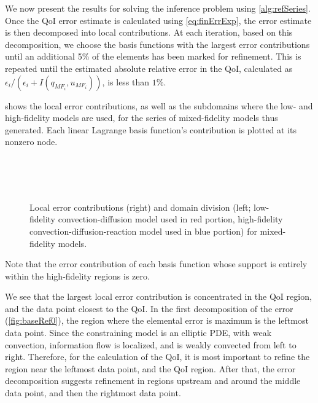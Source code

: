 We now present the results for solving the inference problem using \cref{alg:refSeries}. Once the QoI error estimate is calculated using \cref{eq:finErrExp}, the error estimate is then decomposed into local contributions. At each iteration, based on this decomposition, we choose the basis functions with the largest error contributions until an additional 5\% of the elements has been marked for refinement. This is repeated until the estimated absolute relative error in the QoI, calculated as $\epsilon_i/(\epsilon_i+I(q_{MF_i},u_{MF_i}))$, is less than $1\%$.

 shows the local error contributions, as well as the subdomains where the low- and high-fidelity models are used, for the series of mixed-fidelity models thus generated. Each linear Lagrange basis function's contribution is plotted at its nonzero node.
%
\begin{figure}[htbp]
\centering
{} \\
 \\
 \\
\caption{Local error contributions (right) and domain division (left; low-fidelity convection-diffusion model used in red portion, high-fidelity convection-diffusion-reaction model used in blue portion) for mixed-fidelity models.}
\label{fig:baseRef}
\end{figure}
%
Note that the error contribution of each basis function whose support is entirely within the high-fidelity regions is zero.

We see that the largest local error contribution is concentrated in the QoI region, and the data point closest to the QoI. In the first decomposition of the error (\cref{fig:baseRef0}), the region where the elemental error is maximum is the leftmost data point. Since the constraining model is an elliptic PDE, with weak convection, information flow is localized, and is weakly convected from left to right. Therefore, for the calculation of the QoI, it is most important to refine the region near the leftmost data point, and the QoI region. After that, the error decomposition suggests refinement in regions upstream and around the middle data point, and then the rightmost data point.

